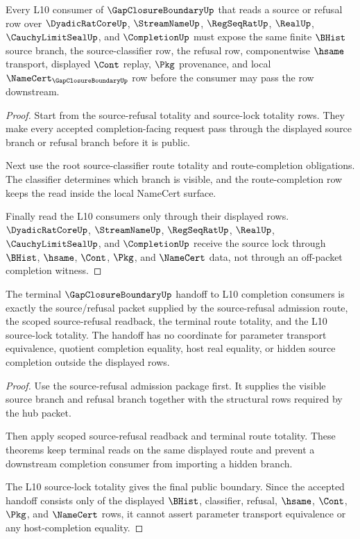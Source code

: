 \begin{theorem}
\label{thm:gap-closure-boundary-l10-source-lock}
Every L10 consumer of $\GapClosureBoundaryUp$ that reads a source or refusal row over $\DyadicRatCoreUp$, $\StreamNameUp$, $\RegSeqRatUp$, $\RealUp$, $\CauchyLimitSealUp$, and $\CompletionUp$ must expose the same finite $\BHist$ source branch, the source-classifier row, the refusal row, componentwise $\hsame$ transport, displayed $\Cont$ replay, $\Pkg$ provenance, and local $\NameCert_{\GapClosureBoundaryUp}$ row before the consumer may pass the row downstream.
\end{theorem}
\begin{proof}
Start from the source-refusal totality and source-lock totality rows. They make every accepted completion-facing request pass through the displayed source branch or refusal branch before it is public.

Next use the root source-classifier route totality and route-completion obligations. The classifier determines which branch is visible, and the route-completion row keeps the read inside the local NameCert surface.

Finally read the L10 consumers only through their displayed rows. $\DyadicRatCoreUp$, $\StreamNameUp$, $\RegSeqRatUp$, $\RealUp$, $\CauchyLimitSealUp$, and $\CompletionUp$ receive the source lock through $\BHist$, $\hsame$, $\Cont$, $\Pkg$, and $\NameCert$ data, not through an off-packet completion witness.
\end{proof}

\begin{theorem}
\label{thm:gap-closure-boundary-terminal-source-handoff}
The terminal $\GapClosureBoundaryUp$ handoff to L10 completion consumers is exactly the source/refusal packet supplied by the source-refusal admission route, the scoped source-refusal readback, the terminal route totality, and the L10 source-lock totality. The handoff has no coordinate for parameter transport equivalence, quotient completion equality, host real equality, or hidden source completion outside the displayed rows.
\end{theorem}
\begin{proof}
Use the source-refusal admission package first. It supplies the visible source branch and refusal branch together with the structural rows required by the hub packet.

Then apply scoped source-refusal readback and terminal route totality. These theorems keep terminal reads on the same displayed route and prevent a downstream completion consumer from importing a hidden branch.

The L10 source-lock totality gives the final public boundary. Since the accepted handoff consists only of the displayed $\BHist$, classifier, refusal, $\hsame$, $\Cont$, $\Pkg$, and $\NameCert$ rows, it cannot assert parameter transport equivalence or any host-completion equality.
\end{proof}

